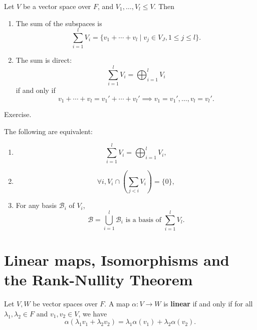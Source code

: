\documentclass[12pt]{article}
\begin{document}
\begin{definition}
	Let $V$ be a vector space over $F$, and $V_1, \ldots, V_l \leq V$. Then
	\begin{enumerate}[\normalfont(i)]
		\item The sum of the subspaces is
			\[
				\sum_{i = 1}^{l} V_i = \{v_1 + \cdots + v_l \mid v_j \in V_J, 1 \leq j \leq l \}
			.\]
		\item The sum is direct:
			\[
			\sum_{i = 1}^{l} V_i = \bigoplus_{i = 1}^{l} V_i
			\]
			if and only if
			\[
			v_1 + \cdots + v_l = v_1' + \cdots + v_l' \implies v_1 = v_1', \ldots, v_l = v_l'
			.\]
	\end{enumerate}
	
\end{definition}

\begin{proofbox}
	Exercise.
\end{proofbox}

\begin{proposition}
	The following are equivalent:
	\begin{enumerate}[\normalfont(i)]
		\item
			\[
			\sum_{i = 1}^{l} V_i = \bigoplus_{i = 1}^{l} V_i
			,\]
		\item 
			\[
				\forall i, V_i \cap \left( \sum_{j < i} V_i \right) = \{0\}
			,\]
		\item For any basis $\mathcal{B}_i$ of $V_i$,
			\[
				\mathcal{B} = \bigcup_{i = 1}^{l} \mathcal{B}_i \text{ is a basis of } \sum_{i = 1}^{l} V_l
			.\]
	\end{enumerate}
	
\end{proposition}

\newpage

\section{Linear maps, Isomorphisms and the Rank-Nullity Theorem}%
\label{sec:linear_maps_isomorphism_and_the_rank_nullity_theorem}

\begin{definition}
	Let $V, W$ be vector spaces over $F$. A map $\alpha : V \to W$ is \textbf{linear} if and only if for all $\lambda_1, \lambda_2 \in F$ and $v_1, v_2 \in V$, we have
	\[
		\alpha(\lambda_1 v_1 + \lambda_2 v_2) = \lambda_1 \alpha(v_1) + \lambda_2 \alpha(v_2)
	.\]
\end{definition}
\end{document}
